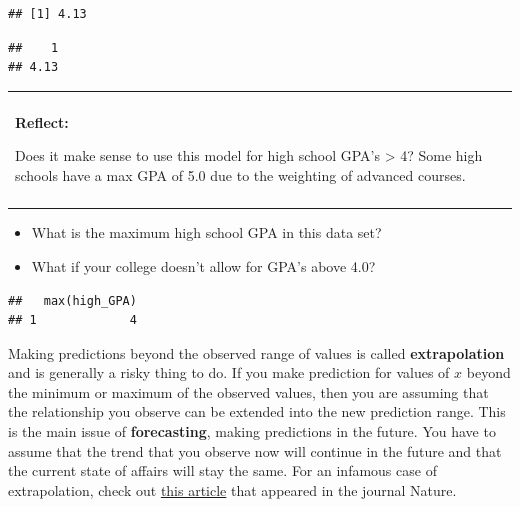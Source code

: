 \documentclass[]{book}
\newenvironment{Shaded}{\begin{snugshade}}{\end{snugshade}}
\newcommand{\CommentTok}[1]{\textcolor[rgb]{0.56,0.35,0.01}{\textit{#1}}}
\newcommand{\DataTypeTok}[1]{\textcolor[rgb]{0.13,0.29,0.53}{#1}}
\newcommand{\FloatTok}[1]{\textcolor[rgb]{0.00,0.00,0.81}{#1}}
\newcommand{\KeywordTok}[1]{\textcolor[rgb]{0.13,0.29,0.53}{\textbf{#1}}}
\newcommand{\NormalTok}[1]{#1}
\newcommand{\OperatorTok}[1]{\textcolor[rgb]{0.81,0.36,0.00}{\textbf{#1}}}
\newcommand{\StringTok}[1]{\textcolor[rgb]{0.31,0.60,0.02}{#1}}
\providecommand{\tightlist}{%
  \setlength{\itemsep}{0pt}\setlength{\parskip}{0pt}}
\newenvironment{reflect}
{
    \begin{center}
    
    \begin{tabular}{|p{0.8\textwidth}|}
    \rowcolor{LightBlue}
    \hline\\
    \rowcolor{LightBlue}
    \textbf{Reflect:}
}
{
    \\\rowcolor{LightBlue}
    \\\hline
    \end{tabular} 
    \end{center}
}
\begin{document}
\begin{verbatim}
## [1] 4.13
\end{verbatim}

\begin{Shaded}
\end{Shaded}

\begin{verbatim}
##    1 
## 4.13
\end{verbatim}

\begin{reflect}
Does it make sense to use this model for high school GPA's
\textgreater{} 4? Some high schools have a max GPA of 5.0 due to the
weighting of advanced courses.
\end{reflect}

\begin{itemize}
\tightlist
\item
  What is the maximum high school GPA in this data set?
\item
  What if your college doesn't allow for GPA's above 4.0?
\end{itemize}

\begin{Shaded}
\end{Shaded}

\begin{verbatim}
##   max(high_GPA)
## 1             4
\end{verbatim}

Making predictions beyond the observed range of values is called \textbf{extrapolation} and is generally a risky thing to do. If you make prediction for values of \(x\) beyond the minimum or maximum of the observed values, then you are assuming that the relationship you observe can be extended into the new prediction range. This is the main issue of \textbf{forecasting}, making predictions in the future. You have to assume that the trend that you observe now will continue in the future and that the current state of affairs will stay the same. For an infamous case of extrapolation, check out \href{https://www.ncbi.nlm.nih.gov/pmc/articles/PMC3173856/}{this article} that appeared in the journal Nature.
\end{document}
